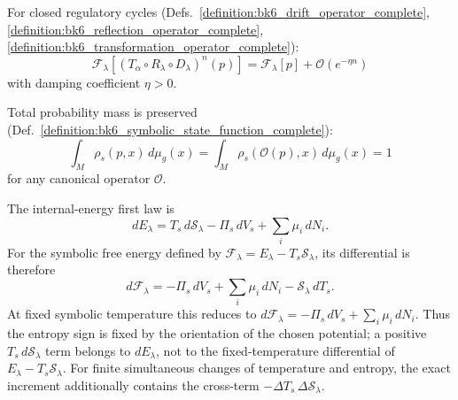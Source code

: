 \begin{axiom}
\label{axiom:bk6_map_equilibrium_invariance_complete}
For closed regulatory cycles (Defs.~\ref{definition:bk6_drift_operator_complete}, \ref{definition:bk6_reflection_operator_complete}, \ref{definition:bk6_transformation_operator_complete}):
\begin{equation}
\mathcal{F}_\lambda[(T_\alpha \circ R_\lambda \circ D_\lambda)^n(p)] = \mathcal{F}_\lambda[p] + \mathcal{O}(e^{-\eta n})
\end{equation}
with damping coefficient $\eta > 0$.
\end{axiom}

\begin{axiom}
\label{axiom:bk6_symbolic_mass_conservation_complete}
Total probability mass is preserved (Def.~\ref{definition:bk6_symbolic_state_function_complete}):
\begin{equation}
\int_M \rho_s(p,x) \, d\mu_g(x) = \int_M \rho_s(\mathcal{O}(p),x) \, d\mu_g(x) = 1
\end{equation}
for any canonical operator $\mathcal{O}$.
\end{axiom}

\begin{axiom}
\label{axiom:bk6_thermodynamic_consistency}
The internal-energy first law is
\[
 dE_\lambda=T_s\,d\mathcal S_\lambda-\Pi_s\,dV_s
      +\sum_i\mu_i\,dN_i.
\]
For the symbolic free energy defined by
$\mathcal F_\lambda=E_\lambda-T_s\mathcal S_\lambda$, its differential is
therefore
\[
 d\mathcal F_\lambda=-\Pi_s\,dV_s+\sum_i\mu_i\,dN_i
       -\mathcal S_\lambda\,dT_s.
\]
At fixed symbolic temperature this reduces to
$d\mathcal F_\lambda=-\Pi_s\,dV_s+\sum_i\mu_i\,dN_i$.
Thus the entropy sign is fixed by the orientation of the chosen potential; a
positive $T_s\,d\mathcal S_\lambda$ term belongs to $dE_\lambda$, not to the
fixed-temperature differential of $E_\lambda-T_s\mathcal S_\lambda$.
For finite simultaneous changes of temperature and entropy, the exact
increment additionally contains the cross-term
$-\Delta T_s\,\Delta\mathcal S_\lambda$.
\end{axiom}

